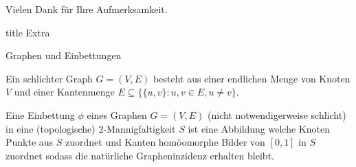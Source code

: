\documentclass[10pt, notheorems]{beamer}
\newcommand{\set}[1]{\{ #1 \}}
\newcommand{\hdef}[1]{\textcolor{darkred2}{#1}}
\begin{document}
\begin{frame}
  \centering
  Vielen Dank für Ihre Aufmerksamkeit.
\end{frame}
\begin{frame}
  \footnotesize{
    
    {}
  }
\end{frame}

\begin{frame}
  
\end{frame}

\begin{frame}
  \vfill
  \centering
  \begin{beamercolorbox}[sep=8pt,center,shadow=true,rounded=true]{title}
    Extra\par
  \end{beamercolorbox}
  \vfill
\end{frame}
\begin{frame}{Graphen und Einbettungen}
  \begin{definition}
    Ein \hdef{schlichter Graph} $G = (V, E)$ besteht aus einer endlichen Menge von Knoten $V$ und einer Kantenmenge $E \subseteq \set{\set{u, v} : u, v \in E, u \neq v}$.
  \end{definition}
  \pause
  \begin{definition}
    Eine \hdef{Einbettung} $\phi$ eines Graphen $G = (V, E)$ (nicht notwendigerweise schlicht) in eine (topologische) $2$-Mannigfaltigkeit $S$ ist eine Abbildung welche Knoten Punkte aus $S$ zuordnet und Kanten homöomorphe Bilder von $[0, 1]$ in $S$ zuordnet sodass die natürliche Grapheninzidenz erhalten bleibt.
  \end{definition}
\end{frame}
\end{document}
